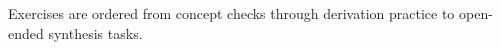Exercises are ordered from concept checks through derivation practice to open-ended synthesis tasks.
